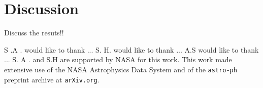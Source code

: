 \section{Discussion}
\label{sec:discussion}

Discuss the resuts!!


\vspace{0.2in}
S .A . would like to thank ...
S. H. would like to thank ... 
A.S would like to thank ...
S. A . and S.H  are supported by NASA for this work. 
This work made extensive use of the NASA Astrophysics Data System and
of the {\tt astro-ph} preprint archive at {\tt arXiv.org}.



